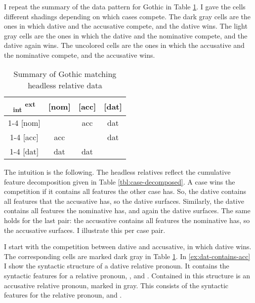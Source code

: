 I repeat the summary of the data pattern for Gothic in Table \ref{tbl:summary-gothic-deriving}. I gave the cells different shadings depending on which cases compete. The dark gray cells are the ones in which dative and the accusative compete, and the dative wins. The light gray cells are the ones in which the dative and the nominative compete, and the dative again wins. The uncolored cells are the ones in which the accusative and the nominative compete, and the accusative wins.

\begin{table}[ht]
  \center
  \caption {Summary of Gothic matching headless relative data}
  \begin{tabular}{c|c|c|c}
    \toprule
        \textsubscript{\ac{int}} \textsuperscript{\ac{ext}}
          & [\ac{nom}]
          & [\ac{acc}]
          & [\ac{dat}]
          \\ \cmidrule{1-4}
      [\ac{nom}]
          &
          & \ac{acc}
          & \cellcolor{LG}\ac{dat}
          \\ \cmidrule{1-4}
      [\ac{acc}]
          & \ac{acc}
          &
          & \cellcolor{DG}\ac{dat}
          \\ \cmidrule{1-4}
      [\ac{dat}]
          & \cellcolor{LG}\ac{dat}
          & \cellcolor{DG}\ac{dat}
          &
          \\
    \bottomrule
  \end{tabular}
    \label{tbl:summary-gothic-deriving}
\end{table}

The intuition is the following. The headless relatives reflect the cumulative feature decomposition given in Table \ref{tbl:case-decomposed}. A case wins the competition if it contains all features the other case has. So, the dative contains all features that the accusative has, so the dative surfaces. Similarly, the dative contains all features the nominative has, and again the dative surfaces. The same holds for the last pair: the accusative contains all features the nominative has, so the accusative surfaces. I illustrate this per case pair.

I start with the competition between dative and accusative, in which dative wins. The corresponding cells are marked dark gray in Table \ref{tbl:summary-gothic-deriving}. In \ref{ex:dat-contains-acc} I show the syntactic structure of a dative relative pronoun. It contains the syntactic features for a relative pronoun, ,  and . Contained in this structure is an accusative relative pronoun, marked in gray. This consists of the syntactic features for the relative pronoun,  and .

